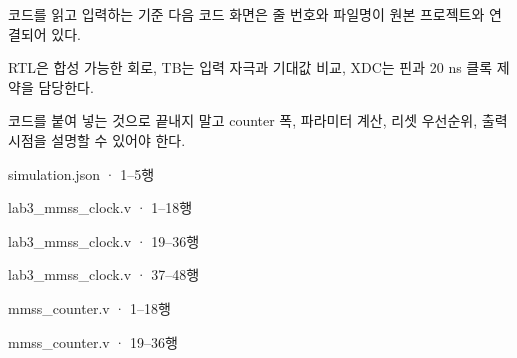 \begin{frame}[label=code]{코드를 읽고 입력하는 기준}
\small
다음 코드 화면은 줄 번호와 파일명이 원본 프로젝트와 연결되어 있다.\par\vspace{0.25cm}
RTL은 합성 가능한 회로, TB는 입력 자극과 기대값 비교, XDC는 핀과 20 ns 클록 제약을 담당한다.\par\vspace{0.25cm}
코드를 붙여 넣는 것으로 끝내지 말고 counter 폭, 파라미터 계산, 리셋 우선순위, 출력 시점을 설명할 수 있어야 한다.
\end{frame}

\begin{frame}[fragile]{simulation.json · 1–5행}

\end{frame}

\begin{frame}[fragile]{lab3\_mmss\_clock.v · 1–18행}

\end{frame}

\begin{frame}[fragile]{lab3\_mmss\_clock.v · 19–36행}

\end{frame}

\begin{frame}[fragile]{lab3\_mmss\_clock.v · 37–48행}

\end{frame}

\begin{frame}[fragile]{mmss\_counter.v · 1–18행}

\end{frame}

\begin{frame}[fragile]{mmss\_counter.v · 19–36행}

\end{frame}

